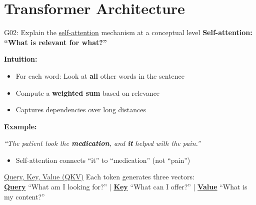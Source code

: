 \documentclass[aspectratio=169, 10pt]{beamer}
\begin{document}
\section{Transformer Architecture}

\begin{frame}{G02: Explain the \href{https://en.wikipedia.org/wiki/Attention_(machine_learning)}{self-attention} mechanism at a conceptual level}
    \textbf{Self-attention: ``What is relevant for what?''}

    \vspace{0.2cm}
    \textbf{Intuition:}
    \begin{itemize}
        \item For each word: Look at \textbf{all} other words in the sentence
        \item Compute a \textbf{weighted sum} based on relevance
        \item Captures dependencies over long distances
    \end{itemize}

    \vspace{0.2cm}
    \textbf{Example:}
    \begin{center}
        \textit{``The patient took the \textbf{medication}, and \textbf{it} helped with the pain.''}
    \end{center}
    \begin{itemize}
        \item Self-attention connects ``it'' to ``medication'' (not ``pain'')
    \end{itemize}

    \vspace{0.1cm}
    \begin{block}{\footnotesize \href{https://jalammar.github.io/illustrated-transformer/\#self-attention-at-a-high-level}{Query, Key, Value (QKV)}}
        \footnotesize Each token generates three vectors: \\
        \href{https://en.wikipedia.org/wiki/Attention_(machine_learning)\#Queries,_keys,_and_values}{\textbf{Query}} ``What am I looking for?'' |
        \href{https://en.wikipedia.org/wiki/Attention_(machine_learning)\#Queries,_keys,_and_values}{\textbf{Key}} ``What can I offer?'' |
        \href{https://en.wikipedia.org/wiki/Attention_(machine_learning)\#Queries,_keys,_and_values}{\textbf{Value}} ``What is my content?''
    \end{block}
\end{frame}
\end{document}
